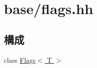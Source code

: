 \hypertarget{flags_8hh}{
\section{base/flags.hh}
\label{flags_8hh}
}
\subsection*{構成}
\begin{DoxyCompactItemize}
\item 
class \hyperlink{classFlags}{Flags$<$ T $>$}
\end{DoxyCompactItemize}

